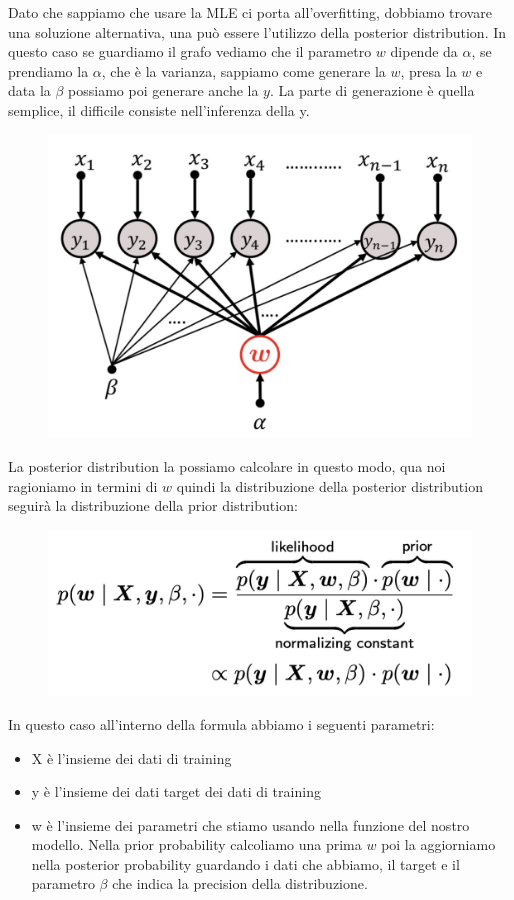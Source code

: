 \documentclass[14pt]{extreport}
\begin{document}
Dato che sappiamo che usare la MLE ci porta all'overfitting, dobbiamo trovare una soluzione alternativa, una può essere l'utilizzo della posterior
distribution. In questo caso se guardiamo il grafo vediamo che il parametro $w$ dipende da $\alpha$, se prendiamo la $\alpha$, che è la varianza,
sappiamo come generare la $w$, presa la $w$ e data la $\beta$ possiamo poi generare anche la $y$. La parte di generazione è quella semplice, il
difficile consiste nell'inferenza della y.


\begin{figure}[H]
	\centering
	\includegraphics[width=0.5\linewidth]{116.jpeg}
\end{figure}

La posterior distribution la possiamo calcolare in questo modo, qua noi ragioniamo in termini di $w$ quindi la distribuzione della posterior
distribution seguirà la distribuzione della prior distribution:
\begin{figure}[H]
	\centering
	\includegraphics[width=0.5\linewidth]{117.jpeg}
\end{figure}
In questo caso all'interno della formula abbiamo i seguenti parametri:
\begin{itemize}
	\item X è l'insieme dei dati di training
	\item y è l'insieme dei dati target dei dati di training
	\item w è l'insieme dei parametri che stiamo usando nella funzione del nostro modello. Nella prior probability calcoliamo una prima $w$ poi la
	      aggiorniamo nella posterior probability guardando i dati che abbiamo, il target e il parametro $\beta$ che indica la precision della
	      distribuzione.
\end{itemize}
\end{document}
